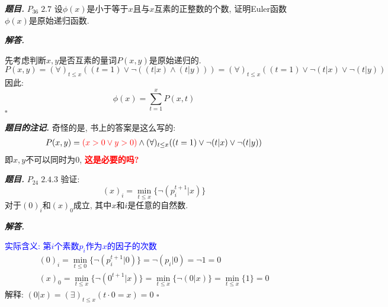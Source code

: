 \documentclass[10pt, a4paper, oneside]{ctexart}
\newenvironment{problem}{\begin{framed}\par\noindent\textbf{\textit{题目. }}}{\end{framed}\par}
\newenvironment{solution}{%
  \par\noindent\textbf{\textit{解答. }}\ignorespaces
}{%
  \hfill\ensuremath{\square}\par
}
\newenvironment{note}{\par\noindent\textbf{\textit{题目的注记. }}\ignorespaces}{\par}
\begin{document}
\begin{problem}
$P_{36}\; 2.7$ 设$\phi(x)$是小于等于$x$且与$x$互素的正整数的个数, 证明Euler函数$\phi(x)$是原始递归函数.
\end{problem}
\begin{solution}
先考虑判断$x,y$是否互素的量词$P(x,y)$是原始递归的. 
$$P(x,y)=(\forall)_{t\leq x}( (t=1) \vee \neg ((t|x) \wedge (t|y)) )=(\forall)_{t\leq x}( (t=1) \vee \neg (t|x) \vee \neg (t|y)) $$
因此:
$$\phi(x)=\sum_{t=1}^{x}P(x,t)$$
\end{solution}
\begin{note}
奇怪的是, 书上的答案是这么写的:
\begin{align*}
    P(x,y)= \textcolor{red}{(x>0 \vee y>0)} \wedge (\forall)_{t\leq x}( (t=1) \vee \neg (t|x) \vee \neg (t|y)) 
\end{align*}
即$x,y$不可以同时为$0$, \textcolor{red}{\textbf{这是必要的吗?}}
\end{note}

\begin{problem}
$P_{24}\; 2.4.3$ 验证: 
$$(x)_i=\min_{t\leq x} \{\neg (p_i^{t+1} | x )\}$$
对于$(0)_i$和$(x)_0$成立, 其中$x$和$i$是任意的自然数.
\end{problem}
\begin{solution}
\textcolor{blue}{实际含义: 第$i$个素数$p_i$作为$x$的因子的次数}
\begin{align*}
    (0)_i=\min_{t\leq 0} \{\neg (p_i^{t+1} | 0 )\}=\neg (p_i|0)=\neg 1 =0\\
    (x)_0=\min_{t\leq x} \{\neg (0^{t+1} | x )\}=\min_{t\leq x} \{\neg (0 | x )\}=\min_{t\leq x} \{1\}=0
\end{align*}
解释: $(0|x)=(\exists)_{t\leq x}(t\cdot 0=x)=0$
\end{solution}
\end{document}
